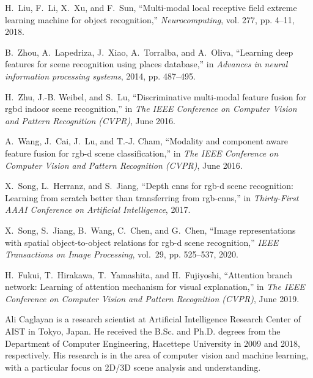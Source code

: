 \documentclass[10pt,journal,compsoc]{IEEEtran}
\begin{document}
\begin{thebibliography}{10}
H.~Liu, F.~Li, X.~Xu, and F.~Sun, ``Multi-modal local receptive field extreme
  learning machine for object recognition,'' \emph{Neurocomputing}, vol. 277,
  pp. 4--11, 2018.

B.~Zhou, A.~Lapedriza, J.~Xiao, A.~Torralba, and A.~Oliva, ``Learning deep
  features for scene recognition using places database,'' in \emph{Advances in
  neural information processing systems}, 2014, pp. 487--495.

H.~Zhu, J.-B. Weibel, and S.~Lu, ``Discriminative multi-modal feature fusion
  for rgbd indoor scene recognition,'' in \emph{The IEEE Conference on Computer
  Vision and Pattern Recognition (CVPR)}, June 2016.

A.~Wang, J.~Cai, J.~Lu, and T.-J. Cham, ``Modality and component aware feature
  fusion for rgb-d scene classification,'' in \emph{The IEEE Conference on
  Computer Vision and Pattern Recognition (CVPR)}, June 2016.

X.~Song, L.~Herranz, and S.~Jiang, ``Depth cnns for rgb-d scene recognition:
  Learning from scratch better than transferring from rgb-cnns,'' in
  \emph{Thirty-First AAAI Conference on Artificial Intelligence}, 2017.

X.~Song, S.~Jiang, B.~Wang, C.~Chen, and G.~Chen, ``Image representations with
  spatial object-to-object relations for rgb-d scene recognition,'' \emph{IEEE
  Transactions on Image Processing}, vol.~29, pp. 525--537, 2020.

H.~Fukui, T.~Hirakawa, T.~Yamashita, and H.~Fujiyoshi, ``Attention branch
  network: Learning of attention mechanism for visual explanation,'' in
  \emph{The IEEE Conference on Computer Vision and Pattern Recognition (CVPR)},
  June 2019.

\end{thebibliography}


\begin{IEEEbiographynophoto}{Ali Caglayan}
is a research scientist at Artificial Intelligence Research Center of AIST in Tokyo, Japan. He received the B.Sc. and Ph.D. degrees from the Department of Computer Engineering, Hacettepe University in 2009 and 2018, respectively. His research is in the area of computer vision and machine learning, with a particular focus on 2D/3D scene analysis and understanding.
\end{IEEEbiographynophoto}
\end{document}
